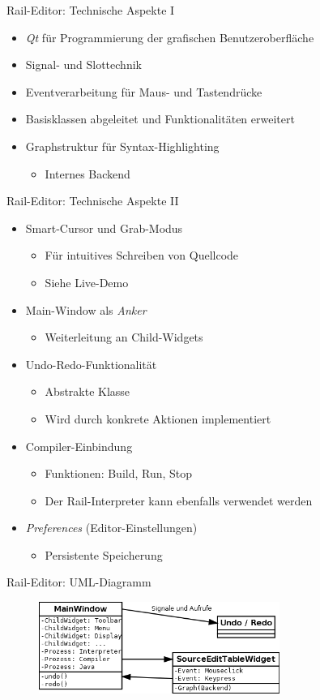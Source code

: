 \begin{frame}{Rail-Editor: Technische Aspekte I}
	\pause
	\begin{itemize}
		\item \textit{Qt} für Programmierung der grafischen Benutzeroberfläche
		\pause
		\item Signal- und Slottechnik
		\pause
		\item Eventverarbeitung für Maus- und Tastendrücke
		\pause
		\item Basisklassen abgeleitet und Funktionalitäten erweitert
		\pause
		\item Graphstruktur für Syntax-Highlighting
		\begin{itemize}
			\item Internes Backend
		\end{itemize}
	\end{itemize}
\end{frame}

\begin{frame}{Rail-Editor: Technische Aspekte II}
	\pause
	\begin{itemize}
	\item Smart-Cursor und Grab-Modus
		\begin{itemize}
			\item Für intuitives Schreiben von Quellcode
			\item Siehe Live-Demo
		\end{itemize}
		\pause
		\item Main-Window als \textit{Anker}
		\begin{itemize}
			\item Weiterleitung an Child-Widgets
		\end{itemize}
		\pause
		\item Undo-Redo-Funktionalität
		\begin{itemize}
			\item Abstrakte Klasse
			\item Wird durch konkrete Aktionen implementiert
		\end{itemize}
		\pause
		\item Compiler-Einbindung
		\begin{itemize}
			\item Funktionen: Build, Run, Stop
			\item Der Rail-Interpreter kann ebenfalls verwendet werden
		\end{itemize}
		\pause
		\item \textit{Preferences} (Editor-Einstellungen)
		\begin{itemize}
			\item Persistente Speicherung
		\end{itemize}
	\end{itemize}
\end{frame}	

\begin{frame}{Rail-Editor: UML-Diagramm}	
	\begin{figure}
		\centering
		\includegraphics[width=0.7\textwidth]{editor-uebersicht}
	\end{figure}
\end{frame}
